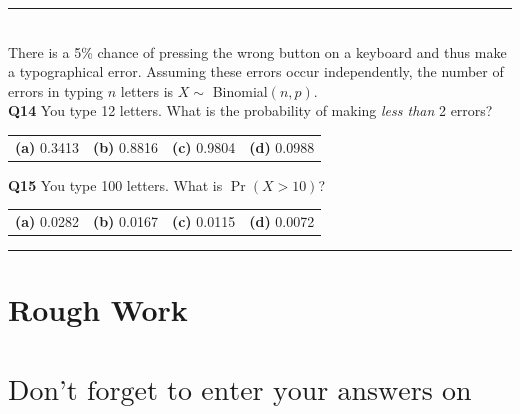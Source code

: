 \documentclass[12pt]{article}
\begin{document}
\rule{\linewidth}{1pt}
\quad\\
There is a 5\% chance of pressing the wrong button on a keyboard and thus make a typographical error. Assuming these errors occur independently, the number of errors in typing $n$ letters is $X \sim$ Binomial$(n,p)$.\\[0.3cm]

{\bf Q14} You type 12 letters. What is the probability of making \emph{less than} 2 errors? \\[0.2cm]
\begin{tabular}{cccc}
{\bf(a)} 0.3413 & {\bf(b)} 0.8816 & {\bf(c)} 0.9804 & {\bf(d)} 0.0988 \\[0.6cm]
\end{tabular}

{\bf Q15} You type 100 letters. What is $\Pr(X > 10)$? \\[0.2cm]
\begin{tabular}{cccc}
{\bf(a)} 0.0282 & {\bf(b)} 0.0167  & {\bf(c)} 0.0115 & {\bf(d)} 0.0072 \\[0.6cm]
\end{tabular}

\rule{\linewidth}{1pt}








\newpage

\section*{Rough Work\\[23cm]}
\section*{\hspace{2cm}$\boxed{\text{Don't forget to enter your answers on the last page!}}$}

\newpage
\end{document}
